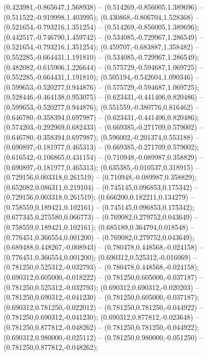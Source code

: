  (0.423981,-0.865647,1.568938) -- (0.514269,-0.856005,1.389696) -- (0.511522,-0.919998,1.403995);
 (0.430868,-0.806704,1.528368) -- (0.521654,-0.793216,1.351254) -- (0.514269,-0.856005,1.389696);
 (0.442517,-0.746790,1.459742) -- (0.534085,-0.729967,1.286549) -- (0.521654,-0.793216,1.351254);
 (0.459707,-0.683887,1.358482) -- (0.552285,-0.664431,1.191810) -- (0.534085,-0.729967,1.286549);
 (0.482082,-0.615906,1.226644) -- (0.575729,-0.594687,1.069725) -- (0.552285,-0.664431,1.191810);
 (0.505194,-0.542604,1.090346) -- (0.599653,-0.520277,0.944876) -- (0.575729,-0.594687,1.069725);
 (0.528446,-0.464138,0.953075) -- (0.623431,-0.441406,0.820486) -- (0.599653,-0.520277,0.944876);
 (0.551559,-0.380776,0.816462) -- (0.646780,-0.358394,0.697987) -- (0.623431,-0.441406,0.820486);
 (0.574203,-0.292969,0.682433) -- (0.669385,-0.271709,0.579002) -- (0.646780,-0.358394,0.697987);
 (0.596002,-0.201374,0.553188) -- (0.690897,-0.181977,0.465313) -- (0.669385,-0.271709,0.579002);
 (0.616542,-0.106865,0.431154) -- (0.710948,-0.089987,0.358829) -- (0.690897,-0.181977,0.465313);
 (0.635385,-0.010537,0.318915) -- (0.729156,0.003318,0.261519) -- (0.710948,-0.089987,0.358829);
 (0.652082,0.086311,0.219104) -- (0.745145,0.096853,0.175342) -- (0.729156,0.003318,0.261519);
 (0.666200,0.182211,0.134279) -- (0.758559,0.189421,0.102161) -- (0.745145,0.096853,0.175342);
 (0.677345,0.275580,0.066773) -- (0.769082,0.279752,0.043649) -- (0.758559,0.189421,0.102161);
 (0.685189,0.364794,0.018548) -- (0.776451,0.366554,0.001200) -- (0.769082,0.279752,0.043649);
 (0.689488,0.448267,-0.008943) -- (0.780478,0.448568,-0.024158) -- (0.776451,0.366554,0.001200);
 (0.690312,0.525312,-0.016069) -- (0.781250,0.525312,-0.032793) -- (0.780478,0.448568,-0.024158);
 (0.690312,0.605000,-0.018222) -- (0.781250,0.605000,-0.037187) -- (0.781250,0.525312,-0.032793);
 (0.690312,0.690312,-0.020203) -- (0.781250,0.690312,-0.041230) -- (0.781250,0.605000,-0.037187);
 (0.690312,0.781250,-0.022012) -- (0.781250,0.781250,-0.044922) -- (0.781250,0.690312,-0.041230);
 (0.690312,0.877812,-0.023648) -- (0.781250,0.877812,-0.048262) -- (0.781250,0.781250,-0.044922);
 (0.690312,0.980000,-0.025112) -- (0.781250,0.980000,-0.051250) -- (0.781250,0.877812,-0.048262);
